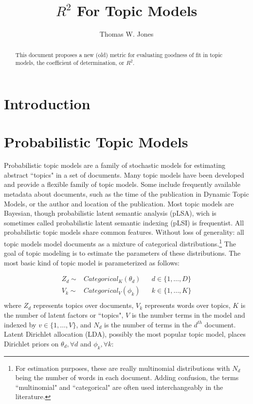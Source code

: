 \documentclass[12pt]{amsart}
\title{$R^2$ For Topic Models}
\author{Thomas W. Jones}
\begin{document}
\maketitle

\begin{abstract}
This document proposes a new (old) metric for evaluating goodness of fit in topic models, the coefficient of determination, or $R^2$.
\end{abstract}

\section{Introduction}

\section{Probabilistic Topic Models}
Probabilistic topic models are a family of stochastic models for estimating abstract ``topics" in a set of documents. Many topic models have been developed and provide a flexible family of topic models. Some include frequently available metadata about documents, such as the time of the publication in Dynamic Topic Models, or the author and location of the publication. Most topic models are Bayesian, though probabilistic latent semantic analysis (pLSA), wich is sometimes called probabilistic latent semantic indexing (pLSI) is frequentist. All probabilistic topic models share common features. Without loss of generality: all topic models model documents as a mixture of categorical distributions.\footnote{For estimation purposes, these are really multinomial distributions with $N_d$ being the number of words in each document. Adding confusion, the terms ``multinomial" and ``categorical" are often used interchangeably in the literature.} The goal of topic modeling is to estimate the parameters of these distributions. The most basic kind of topic model is parameterized as follows:

\begin{align*}
Z_d \sim& Categorical_K({\theta}_d) && d\in \{1, \ldots, D\}\\
V_k \sim& Categorical_V({\phi}_{k}) && k\in \{1, \ldots, K\}\\
\end{align*} where $Z_d$ represents topics over documents, $V_k$ represents words over topics, $K$ is the number of latent factors or ``topics", $V$ is the number terms in the model and indexed by $v \in \{1, \ldots, V\}$, and $N_d$ is the number of terms in the $d^{th}$ document. Latent Dirichlet allocation (LDA), possibly the most popular topic model, places Dirichlet priors on $\theta_d, \forall d$ and $\phi_k, \forall k$:
 
\end{document}
